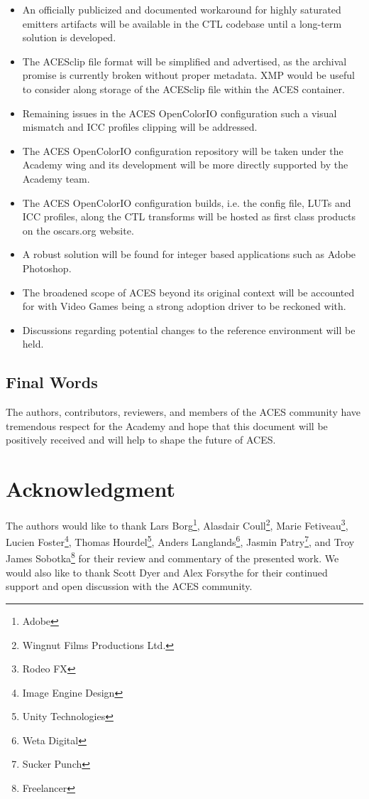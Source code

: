 \documentclass[conference]{IEEEtran}
\begin{document}
\begin{itemize}
	\item An officially publicized and documented workaround for highly saturated emitters artifacts will be available in the CTL codebase until a long-term solution is developed.
	\item The ACESclip file format will be simplified and advertised, as the archival promise is currently broken without proper metadata. XMP would be useful to consider along storage of the ACESclip file within the ACES container.
	\item Remaining issues in the ACES OpenColorIO configuration such a visual mismatch and ICC profiles clipping will be addressed.
	\item The ACES OpenColorIO configuration repository will be taken under the Academy wing and its development will be more directly supported by the Academy team.
	\item The ACES OpenColorIO configuration builds, i.e. the config file, LUTs and ICC profiles, along the CTL transforms will be hosted as first class products on the oscars.org website.
	\item A robust solution will be found for integer based applications such as Adobe Photoshop.
	\item The broadened scope of ACES beyond its original context will be accounted for with Video Games being a strong adoption driver to be reckoned with.
	\item Discussions regarding potential changes to the reference environment will be held.
\end{itemize}

\subsection{Final Words}
The authors, contributors, reviewers, and members of the ACES community have tremendous respect for the Academy and hope that this document will be positively received and will help to shape the future of ACES.


\section*{Acknowledgment}


The authors would like to thank Lars Borg\footnote{Adobe}, Alasdair Coull\footnote{Wingnut Films Productions Ltd.}, Marie Fetiveau\footnote{Rodeo FX}, Lucien Foster\footnote{Image Engine Design}, Thomas Hourdel\footnote{Unity Technologies}, Anders Langlands\footnote{Weta Digital}, Jasmin Patry\footnote{Sucker Punch}, and Troy James Sobotka\footnote{Freelancer} for their review and commentary of the presented work. We would also like to thank Scott Dyer and Alex Forsythe for their continued support and open discussion with the ACES community.
\end{document}
